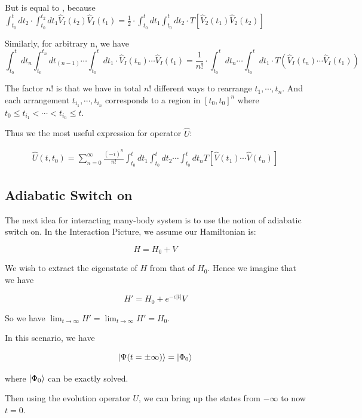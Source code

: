\documentclass{article}
\numberwithin{equation}{subsection} %
\begin{document}
    But  is equal to , because $ \int_{t_0}^{t}dt_2 \cdot \int_{t_0}^{t_2} dt_1 \hat{V}_I(t_2) \hat{V}_I(t_1)= \frac{1}{2} \cdot \int_{t_0}^{t}dt_1 \int_{t_0}^{t}dt_2 \cdot T[\hat{V}_2(t_1) \hat{V}_2(t_2)]  $
    
    Similarly, for arbitrary n, we have
    $$ \int_{t_0}^{t}dt_n \int_{t_0}^{t_n}dt_(n-1) \cdots \int_{t_0}^{t}dt_1 \cdot 
    \hat{V}_I(t_n) \cdots \hat{V}_I(t_1)
    =\frac{1}{n!} \cdot \int_{t_0}^{t}dt_n \cdots \int_{t_0}^{t}dt_1 \cdot 
    T(\hat{V}_I(t_n) \cdots \hat{V}_I(t_1))
    $$
    
    The factor $n!$ is that we have in total $n!$ different ways to rearrange {$t_1,\cdots, t_n$}. And each arrangement {$t_{i_1}, \cdots,t_{i_n}$} corresponds to a region in ${[t_0, t_0]}^n$ where $t_0 \leqslant t_{i_1} < \cdots < t_{i_n} \leqslant t$.
    
    Thus we the most useful expression for operator $\hat{U}$:
    
   	\begin{align}
    	\hat{U}(t,t_0) = \sum_{n=0}^{\infty}
    	\frac{(-i)^n}{n!}
    	\int_{t_0}^{t} dt_1 \int_{t_0}^{t} dt_2
    	\dotsb \int_{t_0}^{t} dt_n
    	T[\hat{V}(t_1)\dotsb\hat{V}(t_{n})]
   	\end{align}

    \subsection{Adiabatic Switch on}
    
    The next idea for interacting many-body system is to use the notion of adiabatic switch on. In the Interaction Picture, we assume our Hamiltonian is:
    
    $$ H=H_0 +V $$
    
    We wish to extract the eigenstate of $H$ from that of $H_0$. Hence we imagine that we have 
    
    $$ H' = H_0 + e^{-\epsilon |t|}V  $$
    
    So we have $\lim_{t\to\infty} H'= \lim_{t\to\infty} H'=H_0 $.
    
    In this scenario, we have
    
    $$ \ket{\Psi(t=\pm\infty)} = \ket{\Phi_0}   $$
    
    where $\ket{\Phi_0}$ can be exactly solved.
    
    Then using the evolution operator $U$, we can bring up the states from $-\infty$ to now $t=0$.
    
\end{document}
